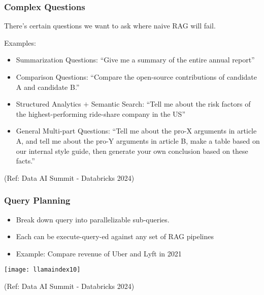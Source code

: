 \begin{frame}[fragile]\frametitle{Complex Questions}
There's certain questions we want to ask where naive RAG will fail.

Examples:
\begin{itemize}
\item Summarization Questions: ``Give me a summary of the entire annual report''
\item Comparison Questions: ``Compare the open-source contributions of candidate A and candidate B.''
\item Structured Analytics $+$ Semantic Search: ``Tell me about the risk factors of the highest-performing ride-share company in the US''
\item General Multi-part Questions: ``Tell me about the pro-X arguments in article A, and tell me about the pro-Y arguments in article B, make a table based on our internal style guide, then generate your own conclusion based on these facts.''
\end{itemize}	
		

 		{\tiny (Ref: Data AI Summit - Databricks 2024)}

\end{frame}

\begin{frame}[fragile]\frametitle{Query Planning}

\begin{itemize}
\item Break down query into parallelizable sub-queries.
\item Each can be execute-query-ed against any set of RAG pipelines
\item Example: Compare revenue of Uber and Lyft in 2021
\end{itemize}	

\begin{center}
\texttt{[image: llamaindex10]}

{\tiny (Ref: Data AI Summit - Databricks 2024)}
\end{center}
\end{frame}



